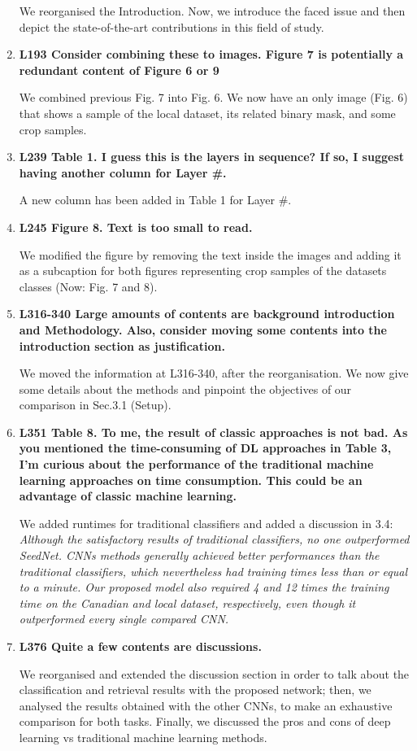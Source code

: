 \documentclass[]{article}
\begin{document}
\begin{enumerate}
		We reorganised the Introduction. Now, we introduce the faced issue and then depict the state-of-the-art contributions in this field of study.
		
		\item \textbf{L193 Consider combining these to images. Figure 7 is potentially a redundant content of Figure 6 or 9}
		
		We combined previous Fig. 7 into Fig. 6. We now have an only image (Fig. 6) that shows a sample of the local dataset, its related binary mask, and some crop samples.
		
		
		\item \textbf{L239 Table 1. I guess this is the layers in sequence? If so, I suggest having another column for Layer \#.}
		
		A new column has been added in Table 1 for Layer \#.
		
		
		\item \textbf{L245 Figure 8. Text is too small to read.}
		
		We modified the figure by removing the text inside the images and adding it as a subcaption for both figures representing crop samples of the datasets classes (Now: Fig. 7 and 8).
		
		\item \textbf{L316-340 Large amounts of contents are background introduction and Methodology. Also, consider moving some contents into the introduction section as justification.}
		
		We moved the information at L316-340, after the reorganisation. We now give some details about the methods and pinpoint the objectives of our comparison in Sec.3.1 (Setup).
		
		\item \textbf{L351 Table 8. To me, the result of classic approaches is not bad. As you mentioned the time-consuming of DL approaches in Table 3, I'm curious about the performance of the traditional machine learning approaches on time consumption. This could be an advantage of classic machine learning.}
		
		We added runtimes for traditional classifiers and added a discussion in 3.4:
		\textit{Although the satisfactory results of traditional classifiers, no one outperformed SeedNet.
		CNNs methods generally achieved better performances than the traditional classifiers, which nevertheless had training times less than or equal to a minute. Our proposed model also required 4 and 12 times the training time on the Canadian and local dataset, respectively, even though it outperformed every single compared CNN.
		}
		
		\item \textbf{L376 Quite a few contents are discussions.}
		
		We reorganised and extended the discussion section in order to talk about the classification and retrieval results with the proposed network; then, we analysed the results obtained with the other CNNs, to make an exhaustive comparison for both tasks. Finally, we discussed the pros and cons of deep learning vs traditional machine learning methods.
		
	\end{enumerate}
	
	
\end{document}
